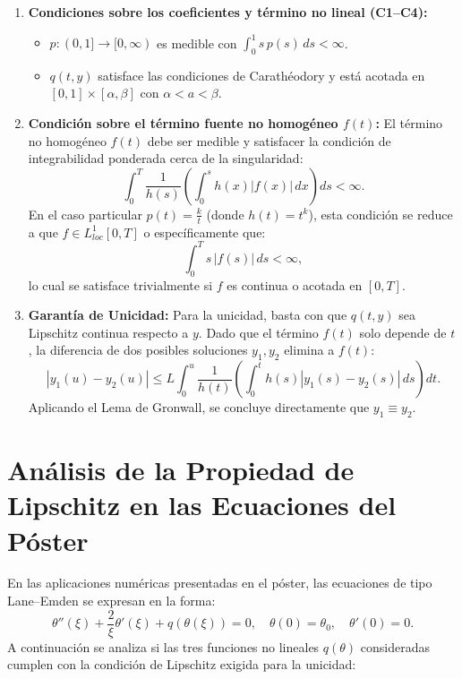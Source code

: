 \documentclass[12pt,a4paper]{article}
\begin{document}
\begin{enumerate}
    \item \textbf{Condiciones sobre los coeficientes y término no lineal (C1--C4):}
    \begin{itemize}
        \item $p:(0, 1] \to [0, \infty)$ es medible con $\int_0^1 s \, p(s) \, ds < \infty$.
        \item $q(t, y)$ satisface las condiciones de Carathéodory y está acotada en $[0, 1] \times [\alpha, \beta]$ con $\alpha < a < \beta$.
    \end{itemize}

    \item \textbf{Condición sobre el término fuente no homogéneo $f(t)$:}
    El término no homogéneo $f(t)$ debe ser medible y satisfacer la condición de integrabilidad ponderada cerca de la singularidad:
    \[
    \int_0^T \frac{1}{h(s)} \left( \int_0^s h(x) |f(x)| \, dx \right) ds < \infty.
    \]
    En el caso particular $p(t) = \frac{k}{t}$ (donde $h(t) = t^k$), esta condición se reduce a que $f \in L^1_{loc}[0, T]$ o específicamente que:
    \[
    \int_0^T s \, |f(s)| \, ds < \infty,
    \]
    lo cual se satisface trivialmente si $f$ es continua o acotada en $[0, T]$.

    \item \textbf{Garantía de Unicidad:}
    Para la unicidad, basta con que $q(t, y)$ sea Lipschitz continua respecto a $y$. Dado que el término $f(t)$ solo depende de $t$, la diferencia de dos posibles soluciones $y_1, y_2$ elimina a $f(t)$:
    \[
    |y_1(u) - y_2(u)| \le L \int_0^u \frac{1}{h(t)} \left( \int_0^t h(s) |y_1(s) - y_2(s)| \, ds \right) dt.
    \]
    Aplicando el Lema de Gronwall, se concluye directamente que $y_1 \equiv y_2$.
\end{enumerate}

\section{Análisis de la Propiedad de Lipschitz en las Ecuaciones del Póster}

En las aplicaciones numéricas presentadas en el póster, las ecuaciones de tipo Lane--Emden se expresan en la forma:
\[
\theta''(\xi) + \frac{2}{\xi}\theta'(\xi) + q(\theta(\xi)) = 0, \quad \theta(0) = \theta_0, \quad \theta'(0) = 0.
\]
A continuación se analiza si las tres funciones no lineales $q(\theta)$ consideradas cumplen con la condición de Lipschitz exigida para la unicidad:
\end{document}
